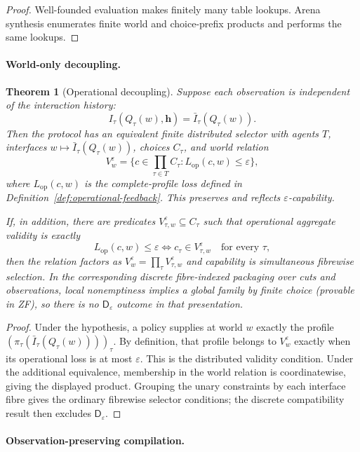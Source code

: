 \documentclass[11pt]{article}
\theoremstyle{plain}
\newtheorem{theorem}{Theorem}[section]
\theoremstyle{definition}
\theoremstyle{remark}
\newcommand{\eps}{\varepsilon}
\begin{document}
\begin{proof}
Well-founded evaluation makes finitely many table lookups. Arena synthesis
enumerates finite world and choice-prefix products and performs the same
lookups.
\end{proof}

\paragraph{World-only decoupling.}

\begin{theorem}[Operational decoupling]
\label{thm:operational-decoupling}
Suppose each observation is independent of the interaction history:
\[
I_\tau(Q_\tau(w),\mathbf h)=\bar I_\tau(Q_\tau(w)).
\]
Then the protocol has an equivalent finite distributed selector with agents
$T$, interfaces $w\mapsto\bar I_\tau(Q_\tau(w))$, choices $C_\tau$, and
world relation
\[
V_w^\eps=
\{c\in\prod_{\tau\in T}C_\tau:
L_{\mathrm{op}}(c,w)\le\eps\},
\]
where $L_{\mathrm{op}}(c,w)$ is the complete-profile loss defined in
Definition~\ref{def:operational-feedback}. This preserves and reflects
$\eps$-capability.

If, in addition, there are predicates
$V_{\tau,w}^\eps\subseteq C_\tau$ such that operational aggregate validity is
exactly
\[
L_{\mathrm{op}}(c,w)\le\eps
\iff
c_\tau\in V_{\tau,w}^\eps\quad\text{for every }\tau,
\]
then the relation factors as $V_w^\eps=\prod_\tau V_{\tau,w}^\eps$ and
capability is simultaneous fibrewise selection. In the corresponding discrete fibre-indexed packaging over cuts and
observations, local nonemptiness implies a global family by finite choice
(provable in ZF), so there is no $\mathsf D_\eps$ outcome in that presentation.
\end{theorem}

\begin{proof}
Under the hypothesis, a policy supplies at world $w$ exactly the profile
$(\pi_\tau(\bar I_\tau(Q_\tau(w))))_\tau$. By definition, that profile belongs
to $V_w^\eps$ exactly when its operational loss is at most $\eps$. This is the
distributed validity condition. Under the additional equivalence, membership in
the world relation is coordinatewise, giving the displayed product. Grouping
the unary constraints by each interface fibre gives the ordinary fibrewise
selector conditions; the discrete compatibility result then excludes
$\mathsf D_\eps$.
\end{proof}

\paragraph{Observation-preserving compilation.}
\end{document}
